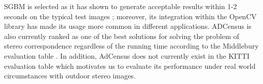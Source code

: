 SGBM is selected as it has shown to generate acceptable results within 1-2 seconds on the typical test images \cite{hir08}; moreover,
its integration within the OpenCV library has made its usage more common in different applications. 
ADCensus is also currently ranked as one of the best solutions 
for solving the problem of stereo correspondence regardless of the running time according to the Middlebury evaluation table \cite{mideval}.
In addition, AdCensus does not currently exist in the KITTI evaluation table which motivates us to evaluate its performance
under real world circumstances with outdoor stereo images.


